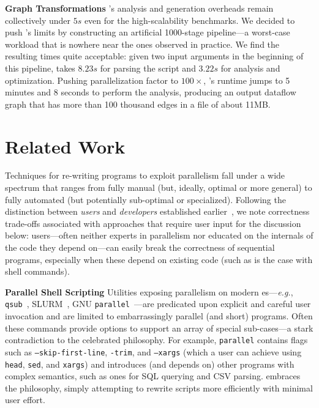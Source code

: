 \documentclass[letterpaper,twocolumn,10pt]{article}
\newcommand{\eg}{{\em e.g.}, }
\newcommand{\heading}[1]{\vspace{4pt}\noindent\textbf{#1}\enspace}
\newcommand{\ttt}[1]{\texttt{#1}}
\begin{document}
\heading{Graph Transformations}
\sys's analysis and generation overheads remain collectively under $5s$ even for the high-scalability benchmarks.
We decided to push \sys's limits by constructing an artificial 1000-stage pipeline---a worst-case workload that is nowhere near the ones observed in practice.
We find the resulting times quite acceptable:
  given two input arguments in the beginning of this pipeline, \sys takes $8.23s$ for parsing the script and $3.22s$ for analysis and optimization.
Pushing parallelization factor to $100\times$, \sys's runtime jumps to 5 minutes and 8 seconds to perform the analysis, producing an output dataflow graph that has more than 100 thousand edges in a file of about 11MB.


\section{Related Work}
\label{related}

Techniques for re-writing programs to exploit parallelism fall under a wide spectrum that ranges from fully manual (but, ideally, optimal or more general) to fully automated (but potentially sub-optimal or specialized).
Following the distinction between \emph{users} and \emph{developers} established earlier~, we note correctness trade-offs associated with approaches that require user input for the discussion below:
   users---often neither experts in parallelism nor educated on the internals of the code they depend on---can easily break the correctness of sequential programs, especially when these depend on existing code (such as is the case with shell commands).

\heading{Parallel Shell Scripting}
Utilities exposing parallelism on modern \unix{}es---\eg \ttt{qsub}~\cite{gentzsch2001sun}, \textsc{SLURM}~\cite{yoo2003slurm}, \textsc{GNU} \ttt{parallel}~\cite{Tange2011a}---are predicated upon explicit and careful user invocation and are limited to embarrassingly parallel (and short) programs.
Often these commands provide options to support an array of special sub-cases---a stark contradiction to the celebrated \unix philosophy.
For example, \ttt{parallel} contains flags such as \ttt{--skip-first-line}, \ttt{-trim}, and \ttt{--xargs} (which a \unix user can achieve using \ttt{head}, \ttt{sed}, and \ttt{xargs})
  and introduces (and depends on) other programs with complex semantics, such as ones for SQL querying and CSV parsing.
\sys embraces the \unix philosophy, simply attempting to rewrite scripts more efficiently with minimal user effort.
\end{document}
